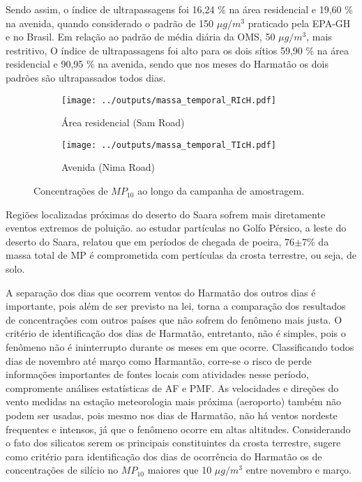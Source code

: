 Sendo assim, o índice de ultrapassagens foi 16,24 \% na área 
residencial e 19,60 \% na avenida, quando considerado o padrão de 150 
$\mu g / m^3$ praticado pela EPA-GH e no Brasil. Em relação
ao padrão de média diária da OMS, 50 $\mu g / m^3$, mais restritivo, 
O índice de ultrapassagens foi alto para os dois sítios 59,90 \% 
na área residencial e 90,95 \% na avenida, sendo que nos meses do Harmatão 
os dois padrões são ultrapassados todos dias. 

\begin{figure}[H]
  \centering
  \begin{subfigure}[b]{0.45\textwidth}
    \texttt{[image: ../outputs/massa\_temporal\_RIcH.pdf]}
    \caption{Área residencial (Sam Road)}
  \end{subfigure}%
  \begin{subfigure}[b]{0.45\textwidth}
    \texttt{[image: ../outputs/massa\_temporal\_TIcH.pdf]}
    \caption{Avenida (Nima Road)}
  \end{subfigure}
  \caption{Concentrações de $MP_{10}$ ao longo da campanha de amostragem.
           \label{fig:massa_temporal_mp10}}
\end{figure}

Regiões localizadas próximas do deserto do Saara sofrem mais diretamente 
eventos extremos de poluição. \citet{kaku2016} ao estudar partículas no 
Golfo Pérsico, a leste do deserto do Saara, relatou que em períodos de chegada 
de poeira, 76$\pm$7\% da massa total de MP é comprometida com pertículas da 
crosta terrestre, ou seja, de solo.

A separação dos dias que ocorrem ventos do Harmatão dos outros dias é importante,
pois além de ser previsto na lei, torna a comparação dos resultados de 
concentrações com outros países que não sofrem do fenômeno mais justa. 
O critério de identificação dos dias de Harmatão, entretanto, não é simples, 
pois o fenômeno 
não é ininterrupto durante os meses em que ocorre. Classificando todos dias
de novembro até março como Harmantão, corre-se o risco de perde informações 
importantes de fontes locais com atividades nesse período, compromente análises
estatísticas de AF e PMF. 
As velocidades e direções do vento medidas na estação meteorologia mais próxima
(aeroporto) também não podem ser usadas, pois mesmo nos dias de Harmatão, 
não há ventos nordeste frequentes e intensos, já que o fenômeno ocorre em 
altas altitudes. 
Considerando o fato dos silicatos serem os principais constituintes da crosta
terrestre, \citet{aboh2009} sugere como critério para identificação dos dias 
de ocorrência do Harmatão os de concentrações de silício no $MP_{10}$ maiores 
que 10 $\mu g/m^3$ entre novembro e março. 

